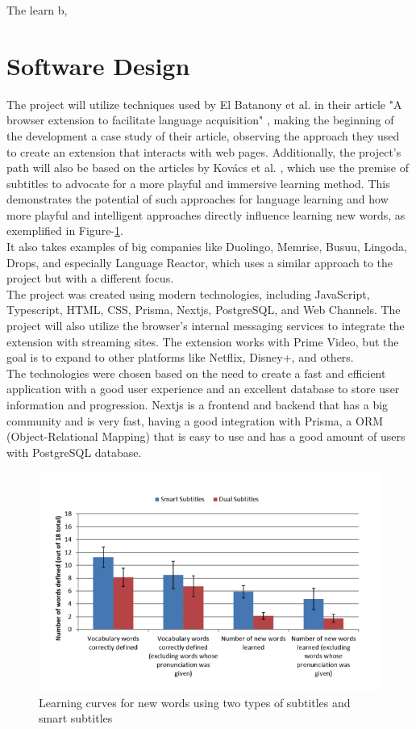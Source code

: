 \documentclass[12pt]{article}
\begin{document}
The learn b\cite{SiddharthLabutov}, \cite{JunyaoJingyong}


\section{Software Design}

The project will utilize techniques used by El Batanony et al. in their article "A browser extension to facilitate language acquisition" \cite{ElBatanony21}, making the beginning of the development a case study of their article, observing the approach they used to create an extension that interacts with web pages. Additionally, the project's path will also be based on the articles by Kovács et al. \cite{Kovacs14}, which use the premise of subtitles to advocate for a more playful and immersive learning method. This demonstrates the potential of such approaches for language learning and how more playful and intelligent approaches directly influence learning new words, as exemplified in Figure-\ref{fig:my_label}. \\
It also takes examples of big companies like Duolingo, Memrise, Busuu, Lingoda, Drops, and especially Language Reactor, which uses a similar approach to the project but with a different focus.  \\
The project was created using modern technologies, including JavaScript, Typescript, HTML, CSS, Prisma, Nextjs, PostgreSQL, and Web Channels. The project will also utilize the browser's internal messaging services to integrate the extension with streaming sites. The extension works with Prime Video, but the goal is to expand to other platforms like Netflix, Disney+, and others. \\
The technologies were chosen based on the need to create a fast and efficient application with a good user experience and an excellent database to store user information and progression. Nextjs is a frontend and backend that has a big community and is very fast, having a good integration with Prisma, a ORM (Object-Relational Mapping) that is easy to use and has a good amount of users with PostgreSQL database. 



\begin{figure}[h]
\centering
\caption{Learning curves for new words using two types of subtitles and smart subtitles}
\label{fig:my_label}
\includegraphics[width=1\textwidth]{assets/3.png}
\end{figure}
\end{document}
